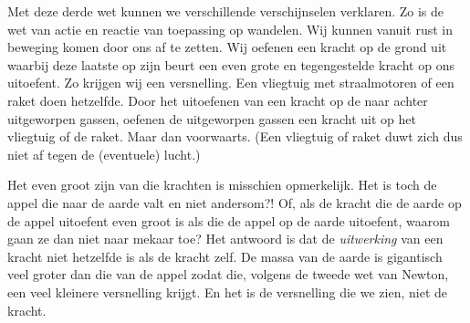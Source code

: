\documentclass{ximera}
\begin{document}
	Met deze derde wet kunnen we verschillende verschijnselen verklaren. Zo is de wet van actie en reactie van toepassing op wandelen. Wij kunnen vanuit rust in beweging komen door ons af te zetten. Wij oefenen een kracht op de grond uit waarbij deze laatste op zijn beurt een even grote en tegengestelde kracht op ons uitoefent. Zo krijgen wij een versnelling. Een vliegtuig met straalmotoren of een raket doen hetzelfde. Door het uitoefenen van een kracht op de naar achter uitgeworpen gassen, oefenen de uitgeworpen gassen een kracht uit op het vliegtuig of de raket. Maar dan voorwaarts. (Een vliegtuig of raket duwt zich dus niet af tegen de (eventuele) lucht.)
	
	Het even groot zijn van die krachten is misschien opmerkelijk. Het is toch de appel die naar de aarde valt en niet andersom?! Of, als de kracht die de aarde op de appel uitoefent even groot is als die de appel op de aarde uitoefent, waarom gaan ze dan niet naar mekaar toe? Het antwoord is dat de \emph{uitwerking} van een kracht niet hetzelfde is als de kracht zelf. De massa van de aarde is gigantisch veel groter dan die van de appel zodat die, volgens de tweede wet van Newton, een veel kleinere versnelling krijgt. En het is de versnelling die we zien, niet de kracht.
	
	

	
\end{document}
